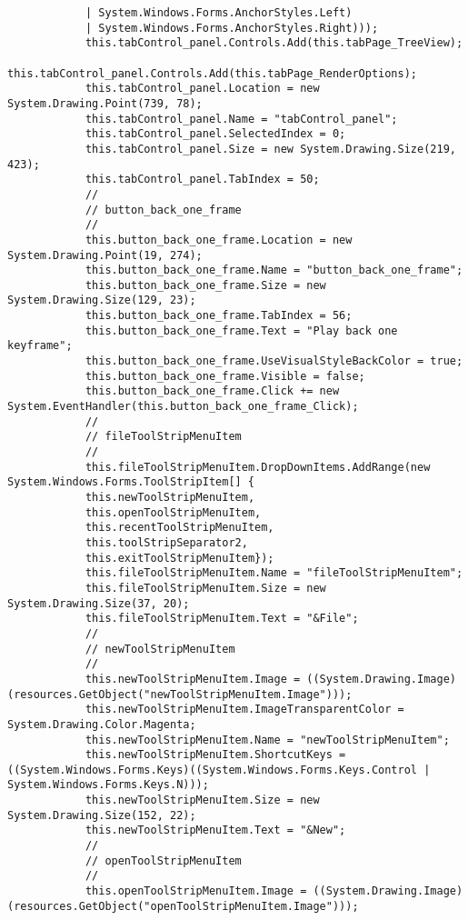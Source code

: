 \begin{scriptsize}
\begin{verbatim}
            | System.Windows.Forms.AnchorStyles.Left) 
            | System.Windows.Forms.AnchorStyles.Right)));
            this.tabControl_panel.Controls.Add(this.tabPage_TreeView);
            this.tabControl_panel.Controls.Add(this.tabPage_RenderOptions);
            this.tabControl_panel.Location = new System.Drawing.Point(739, 78);
            this.tabControl_panel.Name = "tabControl_panel";
            this.tabControl_panel.SelectedIndex = 0;
            this.tabControl_panel.Size = new System.Drawing.Size(219, 423);
            this.tabControl_panel.TabIndex = 50;
            // 
            // button_back_one_frame
            // 
            this.button_back_one_frame.Location = new System.Drawing.Point(19, 274);
            this.button_back_one_frame.Name = "button_back_one_frame";
            this.button_back_one_frame.Size = new System.Drawing.Size(129, 23);
            this.button_back_one_frame.TabIndex = 56;
            this.button_back_one_frame.Text = "Play back one keyframe";
            this.button_back_one_frame.UseVisualStyleBackColor = true;
            this.button_back_one_frame.Visible = false;
            this.button_back_one_frame.Click += new System.EventHandler(this.button_back_one_frame_Click);
            // 
            // fileToolStripMenuItem
            // 
            this.fileToolStripMenuItem.DropDownItems.AddRange(new System.Windows.Forms.ToolStripItem[] {
            this.newToolStripMenuItem,
            this.openToolStripMenuItem,
            this.recentToolStripMenuItem,
            this.toolStripSeparator2,
            this.exitToolStripMenuItem});
            this.fileToolStripMenuItem.Name = "fileToolStripMenuItem";
            this.fileToolStripMenuItem.Size = new System.Drawing.Size(37, 20);
            this.fileToolStripMenuItem.Text = "&File";
            // 
            // newToolStripMenuItem
            // 
            this.newToolStripMenuItem.Image = ((System.Drawing.Image)(resources.GetObject("newToolStripMenuItem.Image")));
            this.newToolStripMenuItem.ImageTransparentColor = System.Drawing.Color.Magenta;
            this.newToolStripMenuItem.Name = "newToolStripMenuItem";
            this.newToolStripMenuItem.ShortcutKeys = ((System.Windows.Forms.Keys)((System.Windows.Forms.Keys.Control | System.Windows.Forms.Keys.N)));
            this.newToolStripMenuItem.Size = new System.Drawing.Size(152, 22);
            this.newToolStripMenuItem.Text = "&New";
            // 
            // openToolStripMenuItem
            // 
            this.openToolStripMenuItem.Image = ((System.Drawing.Image)(resources.GetObject("openToolStripMenuItem.Image")));

\end{verbatim}
\end{scriptsize}

